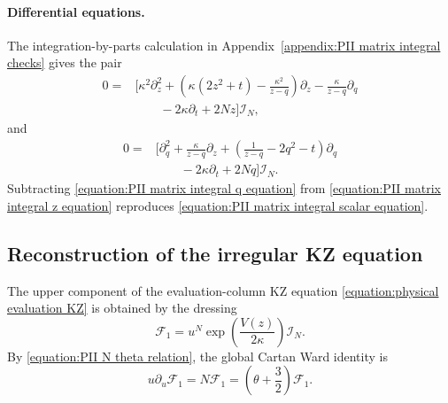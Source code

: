 \documentclass[a4paper,11pt]{article}
\newcommand{\cF}{\mathcal{F}}
\numberwithin{equation}{section}
\begin{document}
\paragraph{Differential equations.} The integration-by-parts calculation in Appendix~\ref{appendix:PII matrix integral checks} gives the pair
\begin{equation}
	\label{equation:PII matrix integral z equation}
	\begin{aligned}
		0={}&
		\Bigg[
		\kappa^{2}\partial_{z}^{2}
		+\left(
		\kappa(2z^{2}+t)
		-\frac{\kappa^{2}}{z-q}
		\right)\partial_{z}
		-\frac{\kappa}{z-q}\partial_{q}
		\\
		&\qquad
		-2\kappa\partial_{t}
		+2Nz
		\Bigg]\mathcal{I}_{N},
	\end{aligned}
\end{equation}
and
\begin{equation}
	\label{equation:PII matrix integral q equation}
	\begin{aligned}
		0={}&
		\Bigg[
		\partial_{q}^{2}
		+\frac{\kappa}{z-q}\partial_{z}
		+\left(
		\frac{1}{z-q}-2q^{2}-t
		\right)\partial_{q}
		\\
		&\qquad
		-2\kappa\partial_{t}
		+2Nq
		\Bigg]\mathcal{I}_{N}.
	\end{aligned}
\end{equation}
Subtracting \eqref{equation:PII matrix integral q equation} from
\eqref{equation:PII matrix integral z equation} reproduces
\eqref{equation:PII matrix integral scalar equation}.

\subsection{Reconstruction of the irregular KZ equation}
\label{subsection:PII integral reconstruction}

The upper component of the evaluation-column KZ equation
\eqref{equation:physical evaluation KZ} is obtained by the dressing
\begin{equation}
	\label{equation:PII matrix integral top component}
	\cF_{1}
	=
	u^{N}
	\exp\left(\frac{V(z)}{2\kappa}\right)
	\mathcal{I}_{N}.
\end{equation}
By \eqref{equation:PII N theta relation}, the global Cartan Ward identity is
\begin{equation}
	u\partial_{u}\cF_{1}
	=N\cF_{1}
	=\left(
	\theta+\frac{3}{2}
	\right)\cF_{1}.
\end{equation}
\end{document}
